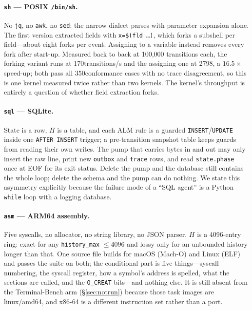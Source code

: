 \documentclass[11pt,a4paper]{article}
\begin{document}
\paragraph{\texttt{sh} --- POSIX \texttt{/bin/sh}.} No \texttt{jq}, no
\texttt{awk}, no \texttt{sed}: the narrow dialect parses with parameter
expansion alone. The first version extracted fields with
\texttt{x=\$(fld \dots)}, which forks a subshell per field---about eight forks
per event. Assigning to a variable instead removes every fork after start-up.
Measured back to back at 100{,}000 transitions each, the forking variant
runs at 170transitions/s and the assigning one at 2798, a
$16.5\times$ speed-up; both pass all 350conformance cases
with no trace disagreement, so this is one kernel measured twice rather than
two kernels. The kernel's
throughput is entirely a question of whether field extraction forks.

\paragraph{\texttt{sql} --- SQLite.} State is a row, $H$ is a table, and each
ALM rule is a guarded \texttt{INSERT}/\texttt{UPDATE} inside one
\texttt{AFTER INSERT} trigger; a pre-transition snapshot table keeps guards from
reading their own writes. The pump that carries bytes in and out may only
insert the raw line, print new \texttt{outbox} and \texttt{trace} rows, and read
\texttt{state.phase} once at EOF for its exit status. Delete the pump and the
database still contains the whole loop; delete the schema and the pump can do
nothing. We state this asymmetry explicitly because the failure mode of a
``SQL agent'' is a Python \texttt{while} loop with a logging database.

\paragraph{\texttt{asm} --- ARM64 assembly.} Five syscalls, no allocator, no
string library, no JSON parser. $H$ is a 4096-entry ring: exact for any
\texttt{history\_max} $\le 4096$ and lossy only for an unbounded history longer
than that. One source file builds for macOS (Mach-O) and Linux (ELF) and
passes the suite on both; the conditional part is five things---syscall
numbering, the syscall register, how a symbol's address is spelled, what the
sections are called, and the \texttt{O\_CREAT} bits---and nothing else. It is
still absent from the Terminal-Bench arm (\S\ref{sec:notrun}) because those
task images are linux/amd64, and x86-64 is a different instruction set rather
than a port.
\end{document}
